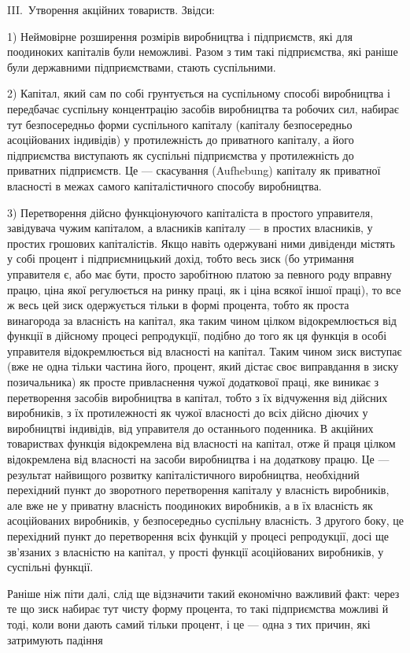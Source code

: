 \parcont{}  %
III.~Утворення акційних товариств. Звідси:

1) Неймовірне розширення розмірів виробництва і підприємств, які для поодиноких капіталів були
неможливі. Разом з тим
такі підприємства, які раніше були державними підприємствами,
стають суспільними.

2) Капітал, який сам по собі грунтується на суспільному
способі виробництва і передбачає суспільну концентрацію засобів виробництва та робочих сил, набирає
тут безпосередньо
форми суспільного капіталу (капіталу безпосередньо асоційованих індивідів) у протилежність до
приватного капіталу, а його
підприємства виступають як суспільні підприємства у протилежність до приватних підприємств. Це —
скасування (Aufhebung)
капіталу як приватної власності в межах самого капіталістичного способу виробництва.

3) Перетворення дійсно функціонуючого капіталіста в простого управителя, завідувача чужим капіталом,
а власників
капіталу — в простих власників, у простих грошових капіталістів. Якщо навіть одержувані ними
дивіденди містять у собі
процент і підприємницький дохід, тобто весь зиск (бо утримання управителя є, або має бути, просто
заробітною платою за
певного роду вправну працю, ціна якої регулюється на ринку
праці, як і ціна всякої іншої праці), то все ж весь цей зиск
одержується тільки в формі процента, тобто як проста винагорода за власність на капітал, яка таким
чином цілком відокремлюється від функції в дійсному процесі репродукції, подібно
до того як ця функція в особі управителя відокремлюється від
власності на капітал. Таким чином зиск виступає (вже не одна
тільки частина його, процент, який дістає своє виправдання
в зиску позичальника) як просте привласнення чужої додаткової
праці, яке виникає з перетворення засобів виробництва в капітал, тобто з їх відчуження від дійсних
виробників, з їх протилежності як чужої власності до всіх дійсно діючих у виробництві індивідів, від
управителя до останнього поденника.
В акційних товариствах функція відокремлена від власності на
капітал, отже й праця цілком відокремлена від власності на
засоби виробництва і на додаткову працю. Це — результат найвищого розвитку капіталістичного
виробництва, необхідний
перехідний пункт до зворотного перетворення капіталу у власність виробників, але вже не у приватну
власність поодиноких
виробників, а в їх власність як асоційованих виробників, у безпосередньо суспільну власність. З
другого боку, це перехідний пункт до перетворення всіх функцій у процесі репродукції,
досі ще зв’язаних з власністю на капітал, у прості функції асоційованих виробників, у суспільні
функції.

Раніше ніж піти далі, слід ще відзначити такий економічно
важливий факт: через те що зиск набирає тут чисту форму процента, то такі підприємства можливі й
тоді, коли вони дають самий
тільки процент, і це — одна з тих причин, які затримують падіння
\parbreak{}  %
